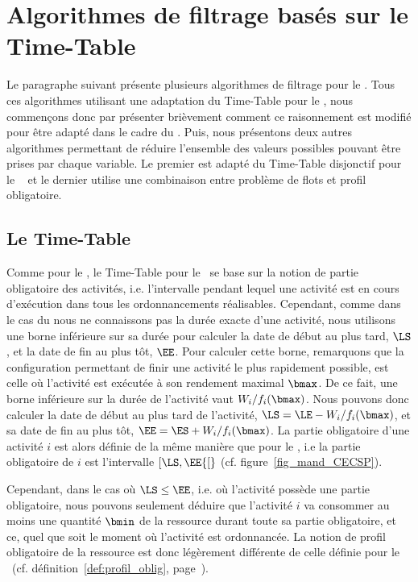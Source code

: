 
\section{Algorithmes de filtrage basés sur le Time-Table}
\label{sec:time_CECSP}
Le paragraphe suivant présente plusieurs algorithmes de filtrage pour le
\CECSP. Tous ces algorithmes utilisant une adaptation du Time-Table
pour le \CUSP, nous commençons donc par présenter brièvement comment
ce raisonnement est modifié pour être adapté dans le cadre du \CECSP.
Puis, nous présentons deux autres algorithmes permettant
de réduire l'ensemble des valeurs possibles pouvant être prises par
chaque variable. Le premier est adapté du Time-Table disjonctif pour
le \CUSP~\cite{Gay2015} et le dernier utilise une combinaison entre
problème de flots et profil obligatoire.

\subsection{Le Time-Table}
\label{sec:TT_CECSP}
Comme pour le \CUSP, le Time-Table pour le \CECSP~se base sur la
notion de partie obligatoire des activités, i.e. l'intervalle pendant
lequel une activité est en cours d'exécution dans tous les
ordonnancements réalisables. Cependant, comme dans le cas du \CECSP
nous ne connaissons pas la durée exacte d'une activité, nous utilisons 
une borne inférieure sur sa durée pour calculer la date de début au
plus tard, $\LS$, et la date de fin au plus tôt, $\EE$. Pour calculer
cette borne, remarquons que la configuration permettant de finir une
activité le plus rapidement possible, est celle où l'activité est
exécutée à son rendement maximal $\bmax$. De ce fait, une borne
inférieure sur la durée de l'activité vaut $W_i/f_i(\bmax)$. Nous
pouvons donc calculer la date de début au plus tard de l'activité,
$\LS=\LE -W_i/f_i(\bmax)$, et sa date de fin au plus tôt,
$\EE=\ES +W_i/f_i(\bmax)$. La partie obligatoire d'une activité $i$ est
alors définie de la même manière que pour le \CUSP, i.e la partie
obligatoire de $i$ est l'intervalle $[\LS,\EE{[}$
(cf. figure~\ref{fig_mand_CECSP}).

Cependant, dans le cas où $\LS \le \EE$, i.e. où l'activité possède
une partie obligatoire, nous pouvons seulement déduire que l'activité
$i$ va consommer au moins une quantité $\bmin$ de la ressource durant
toute sa partie obligatoire, et ce, quel que soit le moment où
l'activité est ordonnancée. La notion de profil obligatoire de la
ressource est donc légèrement différente de celle définie pour le
\CUSP~(cf. définition~\ref{def:profil_oblig},
page~\pageref{def:profil_oblig}).

